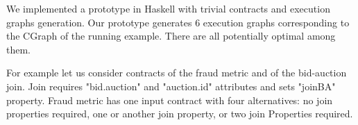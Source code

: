 We implemented a prototype in Haskell with trivial contracts and execution graphs generation.
Our prototype generates 6 execution graphs corresponding to the CGraph of the running example.
There are all potentially optimal among them.

For example let us consider contracts of the fraud metric and of the bid-auction join.
Join requires "bid.auction" and "auction.id" attributes and sets "joinBA" property.
Fraud metric has one input contract with four alternatives: no join properties required, one or another join property, or two join Properties required.
